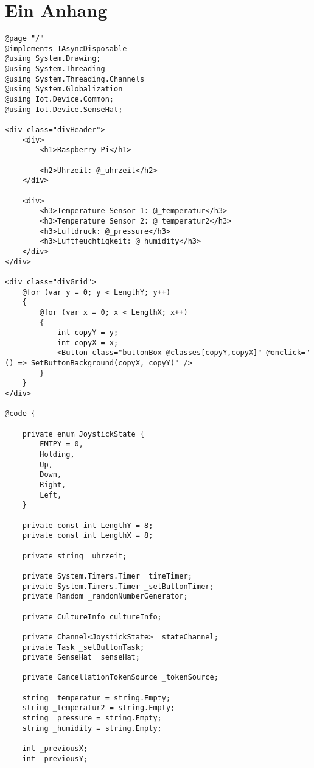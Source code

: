 \chapter{Ein Anhang}
\label{appendix:anhanga}

\begin{lstlisting}[language={[Sharp]C}, caption=Kompletter Demo Code,
	label=lst:DemoCode]
@page "/"
@implements IAsyncDisposable
@using System.Drawing;
@using System.Threading
@using System.Threading.Channels
@using System.Globalization
@using Iot.Device.Common;
@using Iot.Device.SenseHat;

<div class="divHeader">
    <div>
        <h1>Raspberry Pi</h1>

        <h2>Uhrzeit: @_uhrzeit</h2>
    </div>

    <div>
        <h3>Temperature Sensor 1: @_temperatur</h3>
        <h3>Temperature Sensor 2: @_temperatur2</h3>
        <h3>Luftdruck: @_pressure</h3>
        <h3>Luftfeuchtigkeit: @_humidity</h3>
    </div>
</div>

<div class="divGrid">
    @for (var y = 0; y < LengthY; y++)
    {
        @for (var x = 0; x < LengthX; x++)
        {
            int copyY = y;
            int copyX = x;
            <Button class="buttonBox @classes[copyY,copyX]" @onclick="() => SetButtonBackground(copyX, copyY)" />
        }
    }
</div>

@code {

    private enum JoystickState {
        EMTPY = 0,
        Holding,
        Up,
        Down,
        Right,
        Left,
    }

    private const int LengthY = 8;
    private const int LengthX = 8;

    private string _uhrzeit;

    private System.Timers.Timer _timeTimer;
    private System.Timers.Timer _setButtonTimer;
    private Random _randomNumberGenerator;

    private CultureInfo cultureInfo;

    private Channel<JoystickState> _stateChannel;
    private Task _setButtonTask;
    private SenseHat _senseHat;

    private CancellationTokenSource _tokenSource;

    string _temperatur = string.Empty;
    string _temperatur2 = string.Empty;
    string _pressure = string.Empty;
    string _humidity = string.Empty;

    int _previousX;
    int _previousY;


\end{lstlisting}
